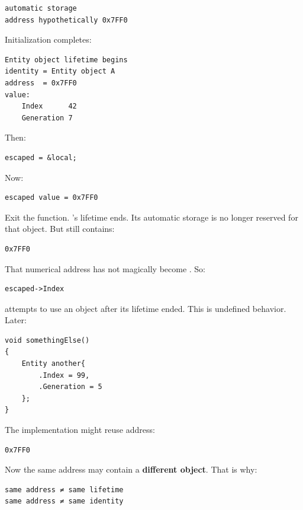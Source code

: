 \begin{verbatim}
automatic storage
address hypothetically 0x7FF0
\end{verbatim}

Initialization completes:

\begin{verbatim}
Entity object lifetime begins
identity = Entity object A
address  = 0x7FF0
value:
    Index      42
    Generation 7
\end{verbatim}

Then:

\begin{verbatim}
escaped = &local;
\end{verbatim}

Now:

\begin{verbatim}
escaped value = 0x7FF0
\end{verbatim}

Exit the function. 's lifetime ends. Its automatic storage is no longer reserved for that object. But  still contains:

\begin{verbatim}
0x7FF0
\end{verbatim}

That numerical address has not magically become . So:

\begin{verbatim}
escaped->Index
\end{verbatim}

attempts to use an object after its lifetime ended. This is undefined behavior. Later:

\begin{verbatim}
void somethingElse()
{
    Entity another{
        .Index = 99,
        .Generation = 5
    };
}
\end{verbatim}

The implementation might reuse address:

\begin{verbatim}
0x7FF0
\end{verbatim}

Now the same address may contain a \textbf{different object}. That is why:

\begin{verbatim}
same address ≠ same lifetime
same address ≠ same identity
\end{verbatim}

